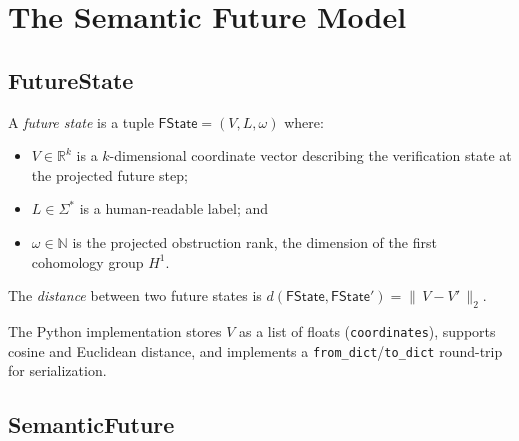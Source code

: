 \documentclass[11pt]{article}
\newcommand{\FState}{\mathsf{FState}}       %
\newcommand{\ObsRank}{\omega}               %
\newcommand{\HOne}{H^1}                     %
\begin{document}
\section{The Semantic Future Model}\label{sec:model}

\subsection{FutureState}

\begin{definition}[FutureState]\label{def:future-state}
A \emph{future state} is a tuple
$\FState = (V, L, \ObsRank)$ where:
\begin{itemize}
  \item $V \in \mathbb{R}^k$ is a $k$-dimensional coordinate vector
        describing the verification state at the projected future step;
  \item $L \in \Sigma^*$ is a human-readable label; and
  \item $\ObsRank \in \mathbb{N}$ is the projected obstruction rank,
        \ie{} the dimension of the first cohomology group $\HOne$.
\end{itemize}
The \emph{distance} between two future states is
$d(\FState, \FState') = \|\,V - V'\,\|_2$.
\end{definition}

\noindent
The Python implementation stores $V$ as a list of floats
(\texttt{coordinates}), supports cosine and Euclidean distance, and
implements a \texttt{from\_dict}/\texttt{to\_dict} round-trip for
serialization.

\subsection{SemanticFuture}
\end{document}
